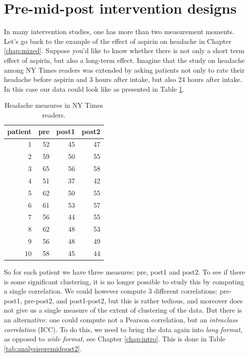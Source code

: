 \documentclass[]{book}\usepackage[]{graphicx}\usepackage[]{color}
\begin{document}
\section{Pre-mid-post intervention designs}


In many intervention studies, one has more than two measurement moments. Let's go back to the example of the effect of aspirin on headache in Chapter \ref{chap:mixed}. Suppose you'd like to know whether there is not only a short term effect of aspirin, but also a long-term effect. Imagine that the study on headache among NY Times readers was extended by asking patients not only to rate their headache before aspirin and 3 hours after intake, but also 24 hours after intake. In this case our data could look like as presented in Table \ref{tab:analysispremidpost1}.

\begin{table}[ht]
\centering
\caption{Headache measures in NY Times readers.} 
\label{tab:analysispremidpost1}
\begin{tabular}{rrrr}
  \hline
patient & pre & post1 & post2 \\ 
  \hline
1 & 52 & 45 & 47 \\ 
  2 & 59 & 50 & 55 \\ 
  3 & 65 & 56 & 58 \\ 
  4 & 51 & 37 & 42 \\ 
  5 & 62 & 50 & 55 \\ 
  6 & 61 & 53 & 57 \\ 
  7 & 56 & 44 & 55 \\ 
  8 & 62 & 48 & 53 \\ 
  9 & 56 & 48 & 49 \\ 
  10 & 58 & 45 & 44 \\ 
   \hline
\end{tabular}
\end{table}


So for each patient we have three measures: pre, post1 and post2. To see if there is some significant clustering, it is no longer possible to study this by computing a single correlation. We could however compute 3 different correlations: pre-post1, pre-post2, and post1-post2, but this is rather tedious, and moreover does not give us a single measure of the extent of clustering of the data. But there is an alternative: one could compute not a Pearson correlation, but an \textit{intraclass correlation} (ICC). To do this, we need to bring the data again into \textit{long format}, as opposed to \textit{wide format}, see Chapter \ref{chap:intro}. This is done in Table \ref{tab:analysispremidpost2}.
\end{document}
